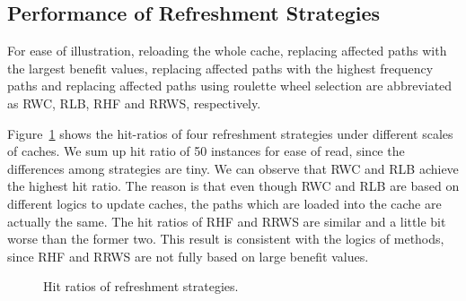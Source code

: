 \subsection{Performance of Refreshment Strategies}
\label{ssec:overhead-strategy}
For ease of illustration, reloading the whole cache, replacing affected paths with the largest benefit values, replacing affected paths with the highest frequency paths and replacing affected paths using roulette wheel selection are abbreviated as RWC, RLB, RHF and RRWS, respectively.

Figure~\ref{fig:comparison-hit} shows the hit-ratios of four refreshment strategies under different scales of caches.
We sum up hit ratio of 50 instances for ease of read, since the differences among strategies are tiny.
We can observe that RWC and RLB achieve the highest hit ratio. The reason is that even though RWC and RLB are based on different logics to update caches, the paths which are loaded into the cache are actually the same.
The hit ratios of RHF and RRWS are similar and a little bit worse than the former two. This result is consistent with the logics of methods, since RHF and RRWS are not fully based on large benefit values. 
\begin{figure}[htbp]
\centering
 \caption{Hit ratios of refreshment strategies.}
 \label{fig:comparison-hit}
\end{figure}


